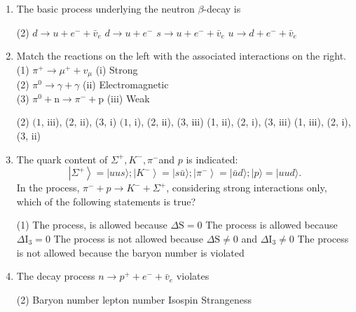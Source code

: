 \begin{enumerate}
	\item  The basic process underlying the neutron $\beta$-decay is
	{}
	 \begin{tasks}(2)
		\task[\textbf{a.}]$d \rightarrow u+e^{-}+\bar{v}_e$
		\task[\textbf{b.}]$d \rightarrow u+e^{-}$
		\task[\textbf{c.}]$s \rightarrow u+e^{-}+\bar{v}_e$
		\task[\textbf{d.}]$u \rightarrow d+e^{-}+\bar{v}_e$ 
	\end{tasks}

	\item  Match the reactions on the left with the associated interactions on the right.\\
	(1) $\pi^{+} \rightarrow \mu^{+}+v_\mu$\hspace{3cm}
	(i) Strong\\
	(2) $\pi^0 \rightarrow \gamma+\gamma$\hspace{3.5cm}
	(ii) Electromagnetic\\
	(3) $\pi^0+\mathrm{n} \rightarrow \pi^{-}+\mathrm{p}$\hspace{2.6cm}
	(iii) Weak
	{}
	 \begin{tasks}(2)
		\task[\textbf{a.}]$(1$, iii), (2, ii), (3, i)
		\task[\textbf{b.}]$(1$, i), (2, ii), (3, iii)
		\task[\textbf{c.}](1, ii), (2, i), (3, iii)
		\task[\textbf{d.}](1, iii), (2, i), (3, ii) 
	\end{tasks}

	\item  The quark content of $\Sigma^{+}, K^{-}, \pi^{-}$and $p$ is indicated:
	$$
	\left|\Sigma^{+}\right\rangle=|u u s\rangle ;\left|K^{-}\right\rangle=|s \bar{u}\rangle ;\left|\pi^{-}\right\rangle=|\bar{u} d\rangle ;|p\rangle=|u u d\rangle .
	$$
	In the process, $\pi^{-}+p \rightarrow K^{-}+\Sigma^{+}$, considering strong interactions only, which of the following statements is true?
	{}
	 \begin{tasks}(1)
		\task[\textbf{a.}]The process, is allowed because $\Delta \mathrm{S}=0$
		\task[\textbf{b.}] The process is allowed because $\Delta \mathrm{I}_3=0$
		\task[\textbf{c.}] The process is not allowed because $\Delta \mathrm{S} \neq 0$ and $\Delta \mathrm{I}_3 \neq 0$
		\task[\textbf{d.}]The process is not allowed because the baryon number is violated 
	\end{tasks}

	\item  The decay process $n \rightarrow p^{+}+e^{-}+\bar{v}_e$ violates
	{}
	 \begin{tasks}(2)
		\task[\textbf{a.}]Baryon number
		\task[\textbf{b.}] lepton number
		\task[\textbf{c.}] Isospin
		\task[\textbf{d.}] Strangeness
	\end{tasks}


\end{enumerate}
